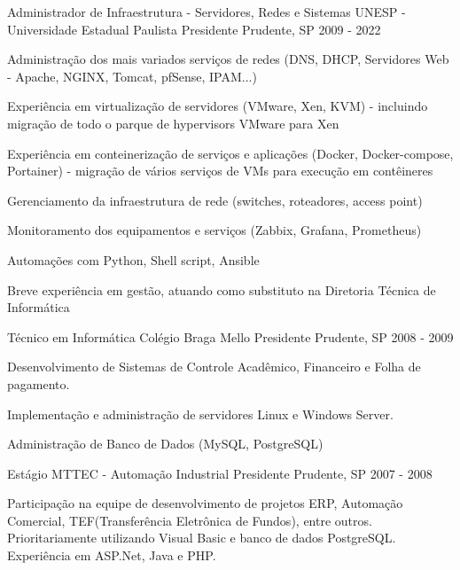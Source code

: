 \begin{cventries}
  \cventry
    {Administrador de Infraestrutura - Servidores, Redes e Sistemas} %
    {UNESP - Universidade Estadual Paulista} %
    {Presidente Prudente, SP} %
    {2009 - 2022} %
    {
      \begin{cvitems} %
        \item {Administração dos mais variados serviços de redes (DNS, DHCP, Servidores Web - Apache, NGINX, Tomcat, pfSense, IPAM...)}
        \item {Experiência em virtualização de servidores (VMware, Xen, KVM) - incluindo migração de todo o parque de hypervisors VMware para Xen}
        \item {Experiência em conteinerização de serviços e aplicações (Docker, Docker-compose, Portainer) - migração de vários serviços de VMs para execução em contêineres}
        \item {Gerenciamento da infraestrutura de rede (switches, roteadores, access point)}
        \item {Monitoramento dos equipamentos e serviços (Zabbix, Grafana, Prometheus)}
        \item {Automações com Python, Shell script, Ansible}
        \item {Breve experiência em gestão, atuando como substituto na Diretoria Técnica de Informática}
      \end{cvitems}
    }

  \cventry
    {Técnico em Informática} %
    {Colégio Braga Mello} %
    {Presidente Prudente, SP} %
    {2008 - 2009} %
    {
      \begin{cvitems} %
        \item {Desenvolvimento de Sistemas de Controle Acadêmico, Financeiro e Folha de pagamento.}
        \item {Implementação e administração de servidores Linux e Windows Server.}
        \item {Administração de Banco de Dados (MySQL, PostgreSQL)}
      \end{cvitems}
    }


\cventry
{Estágio} %
{MTTEC - Automação Industrial} %
{Presidente Prudente, SP} %
{2007 - 2008} %
{
  \begin{cvitems} %
    \item {Participação na equipe de desenvolvimento de projetos ERP, Automação Comercial, TEF(Transferência Eletrônica de Fundos), entre outros. Prioritariamente utilizando Visual Basic e banco de dados PostgreSQL. Experiência em ASP.Net, Java e PHP.}
  \end{cvitems}
}



\end{cventries}
